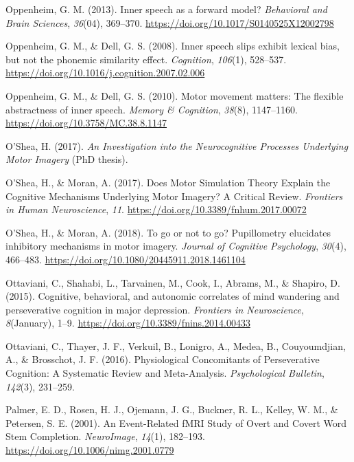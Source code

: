 \documentclass[a4paper,12pt,twoside,openright,oldfontcommands]{memoir}
\begin{document}
\leavevmode\hypertarget{ref-oppenheim_inner_2013}{}%
Oppenheim, G. M. (2013). Inner speech as a forward model? \emph{Behavioral and Brain Sciences}, \emph{36}(04), 369--370. \url{https://doi.org/10.1017/S0140525X12002798}

\leavevmode\hypertarget{ref-oppenheim_inner_2008}{}%
Oppenheim, G. M., \& Dell, G. S. (2008). Inner speech slips exhibit lexical bias, but not the phonemic similarity effect. \emph{Cognition}, \emph{106}(1), 528--537. \url{https://doi.org/10.1016/j.cognition.2007.02.006}

\leavevmode\hypertarget{ref-oppenheim_motor_2010}{}%
Oppenheim, G. M., \& Dell, G. S. (2010). Motor movement matters: The flexible abstractness of inner speech. \emph{Memory \& Cognition}, \emph{38}(8), 1147--1160. \url{https://doi.org/10.3758/MC.38.8.1147}

\leavevmode\hypertarget{ref-oshea_investigation_2017}{}%
O'Shea, H. (2017). \emph{An Investigation into the Neurocognitive Processes Underlying Motor Imagery} (PhD thesis).

\leavevmode\hypertarget{ref-oshea_does_2017}{}%
O'Shea, H., \& Moran, A. (2017). Does Motor Simulation Theory Explain the Cognitive Mechanisms Underlying Motor Imagery? A Critical Review. \emph{Frontiers in Human Neuroscience}, \emph{11}. \url{https://doi.org/10.3389/fnhum.2017.00072}

\leavevmode\hypertarget{ref-oshea_go_2018}{}%
O'Shea, H., \& Moran, A. (2018). To go or not to go? Pupillometry elucidates inhibitory mechanisms in motor imagery. \emph{Journal of Cognitive Psychology}, \emph{30}(4), 466--483. \url{https://doi.org/10.1080/20445911.2018.1461104}

\leavevmode\hypertarget{ref-Ottaviani2015}{}%
Ottaviani, C., Shahabi, L., Tarvainen, M., Cook, I., Abrams, M., \& Shapiro, D. (2015). Cognitive, behavioral, and autonomic correlates of mind wandering and perseverative cognition in major depression. \emph{Frontiers in Neuroscience}, \emph{8}(January), 1--9. \url{https://doi.org/10.3389/fnins.2014.00433}

\leavevmode\hypertarget{ref-ottaviani_physiological_2016}{}%
Ottaviani, C., Thayer, J. F., Verkuil, B., Lonigro, A., Medea, B., Couyoumdjian, A., \& Brosschot, J. F. (2016). Physiological Concomitants of Perseverative Cognition: A Systematic Review and Meta-Analysis. \emph{Psychological Bulletin}, \emph{142}(3), 231--259.

\leavevmode\hypertarget{ref-palmer_event-related_2001}{}%
Palmer, E. D., Rosen, H. J., Ojemann, J. G., Buckner, R. L., Kelley, W. M., \& Petersen, S. E. (2001). An Event-Related fMRI Study of Overt and Covert Word Stem Completion. \emph{NeuroImage}, \emph{14}(1), 182--193. \url{https://doi.org/10.1006/nimg.2001.0779}
\end{document}
